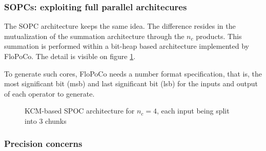 	\subsubsection{SOPCs: exploiting full parallel architecures}

	The SOPC architecture keeps the same idea.
	The difference resides in the mutualization of the summation architecture through the $n_c$ products.
	This summation is performed within a bit-heap based architecture implemented by FloPoCo.
	The detail is visible on figure \ref{fig:Overall architecture}.

	To generate such cores, FloPoCo needs a number format specification, that is, the most significant bit (msb) and last significant bit (lsb) for the inputs and output of each operator to generate.

\begin{figure}
  \begin{center}
\end{center}
\caption{KCM-based SPOC architecture for $n_c=4$, each input being split into 3 chunks  \label{fig:Overall architecture}}
\end{figure}

	\subsubsection{Precision concerns}


